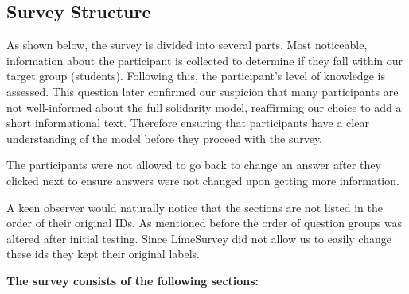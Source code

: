 \subsection{Survey Structure}

As shown below, the survey is divided into several parts. Most noticeable, information about the participant is collected to determine if they fall within our target group (students). Following this, the participant's level of knowledge is assessed. This question later confirmed our suspicion that many participants are not well-informed about the full solidarity model, reaffirming our choice to add a short informational text. Therefore ensuring that participants have a clear understanding of the model before they proceed with the survey. 

The participants were not allowed to go back to change an answer after they clicked next to ensure answers were not changed upon getting more information.

A keen observer would naturally notice that the sections are not listed in the order of their original IDs. As mentioned before the order of question groups was altered after initial testing. Since LimeSurvey did not allow us to easily change these ids they kept their original labels.

\textbf{The survey consists of the following sections:}

